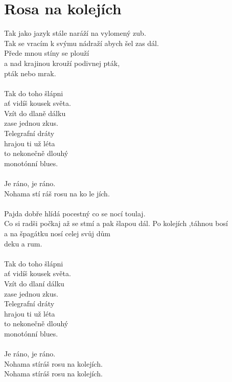 \section{Rosa na kolejích}
Tak jako jazyk stále naráží na vylomený zub.\\
Tak se vracím k svýmu nádraží abych šel zas dál.\\
Přede mnou stíny se plouží\\
a nad krajinou krouží podivnej pták, \\
pták nebo mrak.\\
\\
Tak do toho šlápni \\
ať vidíš kousek světa.\\
Vzít do dlaně dálku \\
zase jednou zkus.\\
Telegrafní dráty \\
hrajou ti už léta\\
to nekonečně dlouhý \\
monotónní blues.\\
\\
Je ráno, je ráno.\\
Nohama stí ráš rosu na ko le jích.\\
\\
Pajda dobře hlídá pocestný co se nocí toulaj.\\
Co si radši počkaj až se stmí a pak šlapou dál.
Po kolejích ,táhnou bosí \\
a na špagátku nosí celej svůj dům\\
deku a rum.\\
\\
Tak do toho šlápni \\
ať vidíš kousek světa.\\
Vzít do dlaní dálku \\
zase jednou zkus.\\
Telegrafní dráty \\
hrajou ti už léta\\
to nekonečně dlouhý \\
monotónní blues.\\
\\
Je ráno, je ráno.\\
Nohama stíráš rosu na kolejích.\\
Nohama stíráš rosu na kolejích.\\